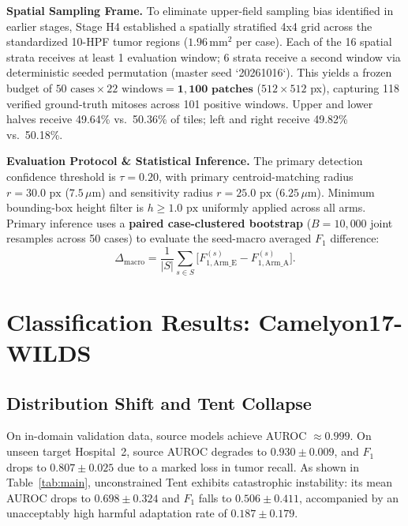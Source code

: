 \documentclass[conference]{IEEEtran}
\begin{document}
\textbf{Spatial Sampling Frame.}
To eliminate upper-field sampling bias identified in earlier stages, Stage H4 established a spatially stratified 4x4 grid across the standardized 10-HPF tumor regions ($1.96\,\mathrm{mm}^2$ per case).
Each of the 16 spatial strata receives at least 1 evaluation window; 6 strata receive a second window via deterministic seeded permutation (master seed `20261016`).
This yields a frozen budget of $50 \text{ cases} \times 22 \text{ windows} = \mathbf{1{,}100\text{ patches}}$ ($512 \times 512$ px), capturing 118 verified ground-truth mitoses across 101 positive windows.
Upper and lower halves receive 49.64\% vs.\ 50.36\% of tiles; left and right receive 49.82\% vs.\ 50.18\%.

\textbf{Evaluation Protocol \& Statistical Inference.}
The primary detection confidence threshold is $\tau=0.20$, with primary centroid-matching radius $r=30.0\text{ px}$ ($7.5\,\mu\text{m}$) and sensitivity radius $r=25.0\text{ px}$ ($6.25\,\mu\text{m}$).
Minimum bounding-box height filter is $h \ge 1.0\text{ px}$ uniformly applied across all arms.
Primary inference uses a \textbf{paired case-clustered bootstrap} ($B=10{,}000$ joint resamples across 50 cases) to evaluate the seed-macro averaged $F_1$ difference:
\begin{equation}
\Delta_{\mathrm{macro}} = \frac{1}{|S|} \sum_{s \in S} \bigl[F_{1, \mathrm{Arm\_E}}^{(s)} - F_{1, \mathrm{Arm\_A}}^{(s)}\bigr].
\end{equation}

\section{Classification Results: Camelyon17-WILDS}

\subsection{Distribution Shift and Tent Collapse}
On in-domain validation data, source models achieve AUROC $\approx 0.999$.
On unseen target Hospital~2, source AUROC degrades to $0.930 \pm 0.009$, and $F_1$ drops to $0.807 \pm 0.025$ due to a marked loss in tumor recall.
As shown in Table~\ref{tab:main}, unconstrained Tent exhibits catastrophic instability: its mean AUROC drops to $0.698 \pm 0.324$ and $F_1$ falls to $0.506 \pm 0.411$, accompanied by an unacceptably high harmful adaptation rate of $0.187 \pm 0.179$.
\end{document}
